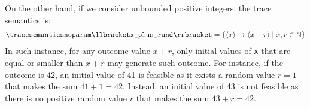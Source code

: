 \begin{example}
On the other hand, if we consider unbounded positive integers, the trace semantics is:
\begin{align*}
  \tracesemanticsnoparam\semanticsof{\texttt{x\_plus\_rand}}
  =
  \setdef{
    \langle{x}\rangle\rightarrow\langle{x+r}\rangle
  }{x, r \in \N}
\end{align*}
In such instance, for any outcome value $x+r$, only initial values of \texttt{x} that are equal or smaller than $x+r$ may generate such outcome.
For instance, if the outcome is 42, an initial value of 41 is feasible as it exists a random value $r = 1$ that makes the sum $41 + 1 = 42$. Instead, an initial value of 43 is not feasible as there is no positive random value $r$ that makes the sum $43 + r = 42$.
\end{example}

